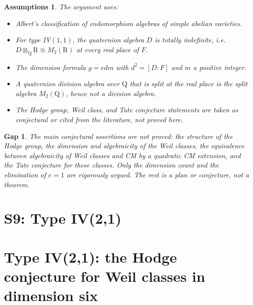 \documentclass{article}
\newcommand{\Q}{\mathrm{Q}}
\newcommand{\R}{\mathrm{R}}
\newtheorem{assumptions}{Assumptions}
\newtheorem{gap}{Gap}
\begin{document}
\begin{assumptions}
The argument uses:
\begin{itemize}
\item Albert's classification of endomorphism algebras of simple abelian varieties.
\item For type IV$(1,1)$, the quaternion algebra $D$ is totally indefinite, i.e.\ $D\otimes_\Q \R \cong M_2(\R)$ at every real place of $F$.
\item The dimension formula $g=e d m$ with $d^2=[D:F]$ and $m$ a positive integer.
\item A quaternion division algebra over $\Q$ that is split at the real place is the split algebra $M_2(\Q)$, hence not a division algebra.
\item The Hodge group, Weil class, and Tate conjecture statements are taken as conjectural or cited from the literature, not proved here.
\end{itemize}
\end{assumptions}

\begin{gap}
The main conjectural assertions are not proved: the structure of the Hodge group, the dimension and algebraicity of the Weil classes, the equivalence between algebraicity of Weil classes and CM by a quadratic CM extension, and the Tate conjecture for these classes. Only the dimension count and the elimination of $e=1$ are rigorously argued. The rest is a plan or conjecture, not a theorem.
\end{gap}

\section{S9: Type IV(2,1)}
\section{Type IV(2,1): the Hodge conjecture for Weil classes in dimension six}
\end{document}
